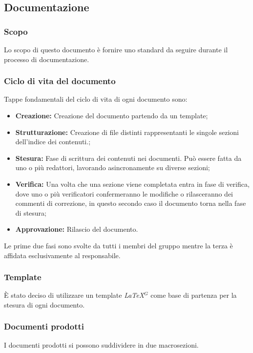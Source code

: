 \subsection{Documentazione}

\subsubsection{Scopo}
Lo scopo di questo documento è fornire uno standard da seguire durante il processo di documentazione.

\subsubsection{Ciclo di vita del documento}
Tappe fondamentali del ciclo di vita di ogni documento sono:
  \begin{itemize}
    \item \textbf{Creazione:} Creazione del documento partendo da un template;
    \item \textbf{Strutturazione:} Creazione di file distinti rappresentanti le singole sezioni dell'indice dei contenuti.;
    \item \textbf{Stesura:} Fase di scrittura dei contenuti nei documenti. Può essere fatta da uno o più redattori, lavorando asincronamente su diverse sezioni;
    \item \textbf{Verifica:} Una volta che una sezione viene completata entra in fase di verifica, dove uno o più verificatori confermeranno le modifiche o rilasceranno dei commenti di correzione, in questo secondo caso il documento torna nella fase di stesura;
    \item \textbf{Approvazione:} Rilascio del documento.
  \end{itemize}
  Le prime due fasi sono svolte da tutti i membri del gruppo mentre la terza è affidata esclusivamente al responsabile.

\subsubsection{Template}
È stato deciso di utilizzare un template \emph{\LaTeX}$^{G}$ come base di partenza per la stesura di ogni documento.

\subsubsection{Documenti prodotti}
I documenti prodotti si possono suddividere in due macrosezioni.

